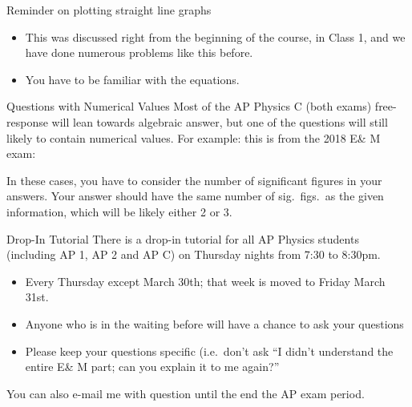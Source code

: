 \documentclass[12pt,aspectratio=169]{beamer}
\begin{document}
\begin{frame}{Reminder on plotting straight line graphs}
\begin{center}
  \hspace{.3in}
\end{center}
\begin{itemize}
\item This was discussed right from the beginning of the course, in Class 1, and we have done
  numerous problems like this before.
\item You have to be familiar with the equations.
\end{itemize}
\end{frame}


\begin{frame}{Questions with Numerical Values}
  Most of the AP Physics C (both exams) free-response will lean
  towards algebraic answer, but one of the questions will still likely to
  contain numerical values. For example: this is
  from the 2018 E\& M exam:
  \begin{center}
  \end{center}
  In these cases, you have to consider the number of significant figures in
  your answers. Your answer should have the same number of sig.\ figs.\ as
  the given information, which will be likely either 2 or 3.
\end{frame}



\begin{frame}{Drop-In Tutorial}
  There is a drop-in tutorial for all AP Physics students (including AP 1, AP 2
  and AP C) on Thursday nights from 7:30 to 8:30pm.
  \begin{itemize}
  \item Every Thursday except March 30th; that week is moved to Friday March 31st.
  \item Anyone who is in the waiting before will have a chance to ask your
    questions
  \item Please keep your questions specific (i.e.\ don't ask ``I didn't understand
    the entire E\& M part; can you explain it to me again?''
  \end{itemize}
  You can also e-mail me with question until the end the AP exam period.
\end{frame}
\end{document}
